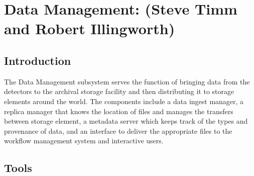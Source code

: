 \chapter{Data Management: (Steve Timm and Robert Illingworth) }
\label{ch:datamgmt}

\section{Introduction}
\label{sec:datamgmt:xyz}  %

The Data Management subsystem serves the function of bringing data from the detectors to the archival storage facility 
and then distributing it to storage elements around the world.  The components include a data ingest manager, a replica manager that knows the 
location of files and manages the transfers between storage element, a metadata server which keeps track of the types and 
provenance of data, and an interface to deliver the appropriate files to the workflow management system and interactive users.


\section{Tools}


